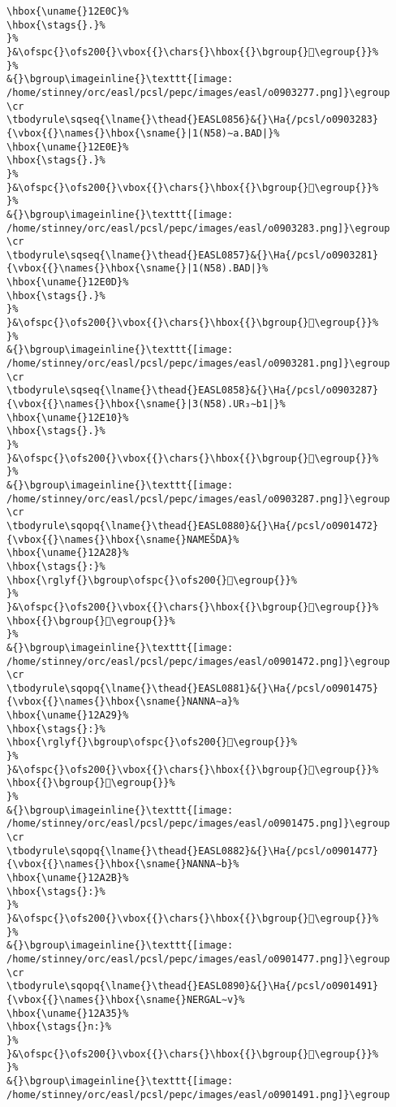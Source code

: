 \begin{verbatim}
\hbox{\uname{}12E0C}%
\hbox{\stags{}.}%
}%
}&\ofspc{}\ofs200{}\vbox{{}\chars{}\hbox{{}\bgroup{}𒸌\egroup{}}%
}%
&{}\bgroup\imageinline{}\texttt{[image: /home/stinney/orc/easl/pcsl/pepc/images/easl/o0903277.png]}\egroup
\cr
\tbodyrule\sqseq{\lname{}\thead{}EASL0856}&{}\Ha{/pcsl/o0903283}{\vbox{{}\names{}\hbox{\sname{}|1(N58)∼a.BAD|}%
\hbox{\uname{}12E0E}%
\hbox{\stags{}.}%
}%
}&\ofspc{}\ofs200{}\vbox{{}\chars{}\hbox{{}\bgroup{}𒸎\egroup{}}%
}%
&{}\bgroup\imageinline{}\texttt{[image: /home/stinney/orc/easl/pcsl/pepc/images/easl/o0903283.png]}\egroup
\cr
\tbodyrule\sqseq{\lname{}\thead{}EASL0857}&{}\Ha{/pcsl/o0903281}{\vbox{{}\names{}\hbox{\sname{}|1(N58).BAD|}%
\hbox{\uname{}12E0D}%
\hbox{\stags{}.}%
}%
}&\ofspc{}\ofs200{}\vbox{{}\chars{}\hbox{{}\bgroup{}𒸍\egroup{}}%
}%
&{}\bgroup\imageinline{}\texttt{[image: /home/stinney/orc/easl/pcsl/pepc/images/easl/o0903281.png]}\egroup
\cr
\tbodyrule\sqseq{\lname{}\thead{}EASL0858}&{}\Ha{/pcsl/o0903287}{\vbox{{}\names{}\hbox{\sname{}|3(N58).UR₃∼b1|}%
\hbox{\uname{}12E10}%
\hbox{\stags{}.}%
}%
}&\ofspc{}\ofs200{}\vbox{{}\chars{}\hbox{{}\bgroup{}𒸐\egroup{}}%
}%
&{}\bgroup\imageinline{}\texttt{[image: /home/stinney/orc/easl/pcsl/pepc/images/easl/o0903287.png]}\egroup
\cr
\tbodyrule\sqopq{\lname{}\thead{}EASL0880}&{}\Ha{/pcsl/o0901472}{\vbox{{}\names{}\hbox{\sname{}NAMEŠDA}%
\hbox{\uname{}12A28}%
\hbox{\stags{}:}%
\hbox{\rglyf{}\bgroup\ofspc{}\ofs200{}𒨨\egroup{}}%
}%
}&\ofspc{}\ofs200{}\vbox{{}\chars{}\hbox{{}\bgroup{}𒨧\egroup{}}%
\hbox{{}\bgroup{}𒨨\egroup{}}%
}%
&{}\bgroup\imageinline{}\texttt{[image: /home/stinney/orc/easl/pcsl/pepc/images/easl/o0901472.png]}\egroup
\cr
\tbodyrule\sqopq{\lname{}\thead{}EASL0881}&{}\Ha{/pcsl/o0901475}{\vbox{{}\names{}\hbox{\sname{}NANNA∼a}%
\hbox{\uname{}12A29}%
\hbox{\stags{}:}%
\hbox{\rglyf{}\bgroup\ofspc{}\ofs200{}𒨩\egroup{}}%
}%
}&\ofspc{}\ofs200{}\vbox{{}\chars{}\hbox{{}\bgroup{}𒨩\egroup{}}%
\hbox{{}\bgroup{}𒨪\egroup{}}%
}%
&{}\bgroup\imageinline{}\texttt{[image: /home/stinney/orc/easl/pcsl/pepc/images/easl/o0901475.png]}\egroup
\cr
\tbodyrule\sqopq{\lname{}\thead{}EASL0882}&{}\Ha{/pcsl/o0901477}{\vbox{{}\names{}\hbox{\sname{}NANNA∼b}%
\hbox{\uname{}12A2B}%
\hbox{\stags{}:}%
}%
}&\ofspc{}\ofs200{}\vbox{{}\chars{}\hbox{{}\bgroup{}𒨫\egroup{}}%
}%
&{}\bgroup\imageinline{}\texttt{[image: /home/stinney/orc/easl/pcsl/pepc/images/easl/o0901477.png]}\egroup
\cr
\tbodyrule\sqopq{\lname{}\thead{}EASL0890}&{}\Ha{/pcsl/o0901491}{\vbox{{}\names{}\hbox{\sname{}NERGAL∼v}%
\hbox{\uname{}12A35}%
\hbox{\stags{}n:}%
}%
}&\ofspc{}\ofs200{}\vbox{{}\chars{}\hbox{{}\bgroup{}𒨵\egroup{}}%
}%
&{}\bgroup\imageinline{}\texttt{[image: /home/stinney/orc/easl/pcsl/pepc/images/easl/o0901491.png]}\egroup

\end{verbatim}
